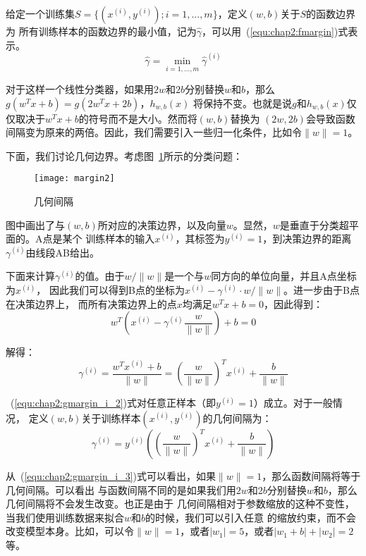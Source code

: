 给定一个训练集$S = \{(x^{(i)},y^{(i)});i = 1, ..., m\}$，定义$(w,b)$关于$S$的函数边界为
所有训练样本的函数边界的最小值，记为$\hat{\gamma}$，可以用~(\ref{equ:chap2:fmargin})式表示。
\begin{equation}
  \label{equ:chap2:fmargin}
  \hat{\gamma} = \min_{i=1,...,m}\hat{\gamma}^{(i)}
\end{equation}

对于这样一个线性分类器，如果用$2w$和$2b$分别替换$w$和$b$，那么$g(w^Tx+b)=g(2w^Tx+2b)$，$h_{w,b}(x)$
将保持不变。也就是说$g$和$h_{w,b}(x)$仅仅取决于$w^Tx+b$的符号而不是大小。然而将$(w,b)$替换为
$(2w,2b)$会导致函数间隔变为原来的两倍。因此，我们需要引入一些归一化条件，比如令$\|w\|=1$。

下面，我们讨论几何边界。考虑图~\ref{fig:margin2}所示的分类问题：
\begin{figure}[ht] %
  \centering
  \texttt{[image: margin2]}
  \caption{几何间隔}
  \label{fig:margin2}
\end{figure}

图中画出了与$(w,b)$所对应的决策边界，以及向量$w$。显然，$w$是垂直于分类超平面的。A点是某个
训练样本的输入$x^{(i)}$，其标签为$y^{(i)} = 1$，到决策边界的距离$\gamma^{(i)}$由线段AB给出。

下面来计算$\gamma^{(i)}$的值。由于$w/\|w\|$是一个与$w$同方向的单位向量，并且A点坐标为$x^{(i)}$，
因此我们可以得到B点的坐标为$x^{(i)} - \gamma^{(i)} \cdot w/\|w\|$。进一步由于B点在决策边界上，
而所有决策边界上的点$x$均满足$w^Tx+b=0$，因此得到：
\begin{equation}
  \label{equ:chap2:gmargin_i_1}
  w^T\left(x^{(i)} - \gamma^{(i)}\frac{w}{\|w\|}\right) + b = 0
\end{equation}

解得：
\begin{equation}
  \label{equ:chap2:gmargin_i_2}
  \gamma^{(i)} = \frac{w^Tx^{(i)}+b}{\|w\|} = \left(\frac{w}{\|w\|}\right)^Tx^{(i)} + \frac{b}{\|w\|}
\end{equation}

~(\ref{equ:chap2:gmargin_i_2})式对任意正样本（即$y^{(i)} = 1$）成立。对于一般情况，
定义$(w,b)$关于训练样本$(x^{(i)}, y^{(i)})$的几何间隔为：
\begin{equation}
  \label{equ:chap2:gmargin_i_3}
  \gamma^{(i)} = y^{(i)}\left(\left(\frac{w}{\|w\|}\right)^Tx^{(i)} + \frac{b}{\|w\|}\right)
\end{equation}

从~(\ref{equ:chap2:gmargin_i_3})式可以看出，如果$\|w\|=1$，那么函数间隔将等于几何间隔。可以看出
与函数间隔不同的是如果我们用$2w$和$2b$分别替换$w$和$b$，那么几何间隔将不会发生改变。也正是由于
几何间隔相对于参数缩放的这种不变性，当我们使用训练数据来拟合$w$和$b$的时候，我们可以引入任意
的缩放约束，而不会改变模型本身。比如，可以令$\|w\|=1$，或者$|w_1|=5$，或者$|w_1+b|+|w_2|=2$等。

